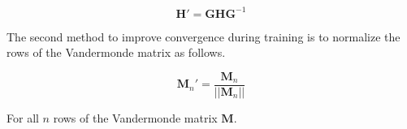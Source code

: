 \begin{equation}
\textbf{H}' = \textbf{G} \textbf{H} \textbf{G}^{-1}
\end{equation}

The second method to improve convergence during training is to normalize the rows of the Vandermonde matrix as follows.

\begin{equation}
\textbf{M}_n' = \frac{\textbf{M}_n}{||\textbf{M}_n||}
\end{equation}

For all $n$ rows of the Vandermonde matrix $\textbf{M}$.






